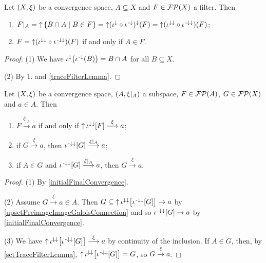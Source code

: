 \begin{lemma} \label{setTraceFilterLemma}
Let $\left( X,\xi \right)$ be a convergence space, $A\subseteq X$ and $F\in\operatorname{\mathcal{FP}}(X)$ a filter. Then
\begin{enumerate}
\item $F|_A = \upset \setbuilder{B\cap A}{B\in F} = \upset( \iota^{\imf}\circ \iota^{\preimf})^\imf(F) = \upset(\iota^{\imf\imf}\circ \iota^{\preimf\imf})(F)$;
\item $F = \operatorname{\uparrow}(\iota^{\downarrow\downarrow}\circ \iota^{{\text{\hspace{0.15em}-}\downarrow}\downarrow})(F)$ \textup{if and only if} $A\in F$.
\end{enumerate}
\end{lemma}
\begin{proof}
(1) We have $\iota^{\downarrow}\big(\iota^{{\text{\hspace{0.15em}-}\downarrow}}(B)\big) = B\cap A$ for all $B\subseteq X$.

(2) By 1. and \ref{traceFilterLemma}.
\end{proof}

\begin{lemma} \label{subspaceConvergence}
Let $\left( X,\xi \right)$ be a convergence space, $\left( A,\xi|_A \right)$ a subspace, $F\in \operatorname{\mathcal{FP}}(A)$, $G\in \operatorname{\mathcal{FP}}(X)$ and $a\in A$. Then
\begin{enumerate}
\item $F \overset{\xi|_A}{\longrightarrow} a$ if and only if $\operatorname{\uparrow} \iota^{\downarrow\downarrow}[F] \overset{\xi}{\longrightarrow} a$;
\item if $G\overset{\xi}{\longrightarrow} a$, then $\iota^{{\text{\hspace{0.15em}-}\downarrow}\downarrow}[G]\overset{\xi|_A}{\longrightarrow} a$;
\item if $A\in G$ and $\iota^{{\text{\hspace{0.15em}-}\downarrow}\downarrow}[G]\overset{\xi|_A}{\longrightarrow} a$, then $G\overset{\xi}{\longrightarrow} a$.
\end{enumerate}
\end{lemma}
\begin{proof}
(1) By \ref{initialFinalConvergence}.

(2) Assume $G\overset{\xi}{\longrightarrow} a \in A$. Then $G \subseteq \operatorname{\uparrow}\iota^{\downarrow\downarrow}\big[\iota^{{\text{\hspace{0.15em}-}\downarrow}\downarrow}[G]\big] \to a$ by \ref{upsetPreimageImageGaloisConnection} and so $\iota^{{\text{\hspace{0.15em}-}\downarrow}\downarrow}[G] \to a$ by \ref{initialFinalConvergence}.

(3) We have $\operatorname{\uparrow}\iota^{\downarrow\downarrow}\big[\iota^{{\text{\hspace{0.15em}-}\downarrow}\downarrow}[G]\big] \overset{\xi}{\longrightarrow} a$ by continuity of the inclusion. If $A\in G$, then, by \ref{setTraceFilterLemma}, $\operatorname{\uparrow}\iota^{\downarrow\downarrow}\big[\iota^{{\text{\hspace{0.15em}-}\downarrow}\downarrow}[G]\big] = G$, so $G \overset{\xi}{\longrightarrow} a$.
\end{proof}


